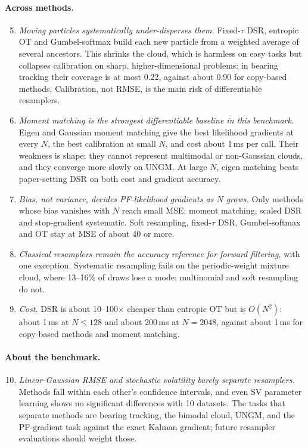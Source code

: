 \paragraph{Across methods.}
\begin{enumerate}\setcounter{enumi}{4}
\item \emph{Moving particles systematically under-disperses them.} Fixed-$\tau$ DSR, entropic OT and Gumbel-softmax build each new particle from a weighted average of several ancestors. This shrinks the cloud, which is harmless on easy tasks but collapses calibration on sharp, higher-dimensional problems: in bearing tracking their coverage is at most 0.22, against about 0.90 for copy-based methods. Calibration, not RMSE, is the main risk of differentiable resamplers.
\item \emph{Moment matching is the strongest differentiable baseline in this benchmark.} Eigen and Gaussian moment matching give the best likelihood gradients at every $N$, the best calibration at small $N$, and cost about 1\,ms per call. Their weakness is shape: they cannot represent multimodal or non-Gaussian clouds, and they converge more slowly on UNGM. At large $N$, eigen matching beats paper-setting DSR on both cost and gradient accuracy.
\item \emph{Bias, not variance, decides PF-likelihood gradients as $N$ grows.} Only methods whose bias vanishes with $N$ reach small MSE: moment matching, scaled DSR and stop-gradient systematic. Soft resampling, fixed-$\tau$ DSR, Gumbel-softmax and OT stay at MSE of about 40 or more.
\item \emph{Classical resamplers remain the accuracy reference for forward filtering,} with one exception. Systematic resampling fails on the periodic-weight mixture cloud, where 13--16\% of draws lose a mode; multinomial and soft resampling do not.
\item \emph{Cost.} DSR is about 10--100$\times$ cheaper than entropic OT but is $O(N^2)$: about 1\,ms at $N\le128$ and about 200\,ms at $N{=}2048$, against about 1\,ms for copy-based methods and moment matching.
\end{enumerate}

\paragraph{About the benchmark.}
\begin{enumerate}\setcounter{enumi}{9}
\item \emph{Linear-Gaussian RMSE and stochastic volatility barely separate resamplers.} Methods fall within each other's confidence intervals, and even SV parameter learning shows no significant differences with 10 datasets. The tasks that separate methods are bearing tracking, the bimodal cloud, UNGM, and the PF-gradient task against the exact Kalman gradient; future resampler evaluations should weight those.
\end{enumerate}


